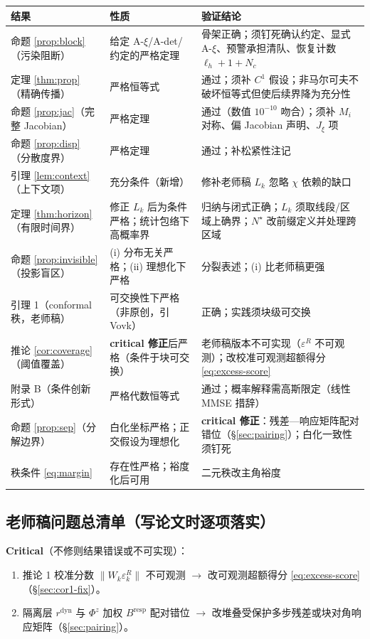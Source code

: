 \documentclass[11pt,a4paper]{ctexart}
\theoremstyle{remark}
\begin{document}
\begin{center}
\small
\begin{tabular}{p{}p{}p{}}
\toprule
结果 & 性质 & 验证结论 \\
\midrule
命题 \ref{prop:block}（污染阻断） & 给定 A-$\xi$/A-det/约定的严格定理 & 骨架正确；须钉死确认约定、显式 A-$\xi$、预警承担清队、恢复计数 $\ell_h{+}1{+}N_c$ \\
定理 \ref{thm:prop}（精确传播） & 严格恒等式 & 通过；须补 $C^1$ 假设；非马尔可夫不破坏恒等式但使后续界降为充分性 \\
命题 \ref{prop:jac}（完整 Jacobian） & 严格定理 & 通过（数值 $10^{-10}$ 吻合）；须补 $M_i$ 对称、偏 Jacobian 声明、$J_\xi$ 项 \\
命题 \ref{prop:disp}（分散度界） & 严格定理 & 通过；补松紧性注记 \\
引理 \ref{lem:context}（上下文项） & 充分条件（新增） & 修补老师稿 $L_k$ 忽略 $\chi$ 依赖的缺口 \\
定理 \ref{thm:horizon}（有限时间界） & 修正 $L_k$ 后为条件严格；统计包络下高概率界 & 归纳与闭式正确；$L_k$ 须取线段/区域上确界；$N^\star$ 改前缀定义并处理跨区域 \\
命题 \ref{prop:invisible}（投影盲区） & (i) 分布无关严格；(ii) 理想化下严格 & 分裂表述；(i) 比老师稿更强 \\
引理 1（conformal 秩，老师稿） & 可交换性下严格（非原创，引 Vovk） & 正确；实践须块级可交换 \\
推论 \ref{cor:coverage}（阈值覆盖） & \textbf{critical 修正}后严格（条件于块可交换） & 老师稿版本不可实现（$\varepsilon^R$ 不可观测）；改校准可观测超额得分 \eqref{eq:excess-score} \\
附录 B（条件创新形式） & 严格代数恒等式 & 通过；概率解释需高斯限定（线性 MMSE 措辞） \\
命题 \ref{prop:sep}（分解边界） & 白化坐标严格；正交假设为理想化 & \textbf{critical 修正}：残差—响应矩阵配对错位（\S\ref{sec:pairing}）；白化一致性须钉死 \\
秩条件 \eqref{eq:margin} & 存在性严格；裕度化后可用 & 二元秩改主角裕度 \\
\bottomrule
\end{tabular}
\end{center}

\subsection{老师稿问题总清单（写论文时逐项落实）}

\textbf{Critical}（不修则结果错误或不可实现）：
\begin{enumerate}[label=C\arabic*.]
\item 推论 1 校准分数 $\|W_k\varepsilon^R_k\|$ 不可观测 $\to$ 改可观测超额得分 \eqref{eq:excess-score}（\S\ref{sec:cor1-fix}）。
\item 隔离层 $r^{\mathrm{dyn}}$ 与 $\Phi^z$ 加权 $B^{\mathrm{resp}}$ 配对错位 $\to$ 改堆叠受保护多步残差或块对角响应矩阵（\S\ref{sec:pairing}）。
\end{enumerate}
\end{document}

